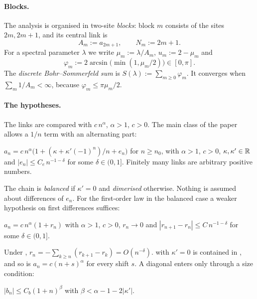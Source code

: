\paragraph{Blocks.} The analysis is organised in two-site \emph{blocks}: block $m$
consists of the sites $2m,2m+1$, and its central link is
\[
  A_m:=a_{2m+1},\qquad N_m:=2m+1 .
\]
For a spectral parameter $\lambda$ we write $\mu_m:=\lambda/A_m$, $u_m:=2-\mu_m$ and
\begin{equation}\label{eq:phim}
  \varphi_m:=2\arcsin\bigl(\min(1,\mu_m/2)\bigr)\in[0,\pi].
\end{equation}
The \emph{discrete Bohr--Sommerfeld sum} is $S(\lambda):=\sum_{m\ge0}\varphi_m$. It
converges when $\sum_m 1/A_m<\infty$, because $\varphi_m\le\pi\mu_m/2$.

\paragraph{The hypotheses.} The links are compared with $c\,n^\alpha$, $\alpha>1$,
$c>0$. The main class of the paper allows a $1/n$ term with an alternating part:
\begin{hypothesis}\label{hyp:D}
$a_n=c\,n^\alpha\bigl(1+(\kappa+\kappa'(-1)^n)/n+e_n\bigr)$ for $n\ge n_0$, with
$\alpha>1$, $c>0$, $\kappa,\kappa'\in\mathbb{R}$ and $|e_n|\le C_e\,n^{-1-\delta}$ for some
$\delta\in(0,1]$. Finitely many links are arbitrary positive numbers.
\end{hypothesis}
\noindent The chain is \emph{balanced} if $\kappa'=0$ and \emph{dimerised} otherwise.
Nothing is assumed about differences of $e_n$. For the first-order law in the balanced
case a weaker hypothesis on first differences suffices:
\begin{hypothesis}\label{hyp:H}
$a_n=c\,n^\alpha(1+r_n)$ with $\alpha>1$, $c>0$, $r_n\to0$ and
$|r_{n+1}-r_n|\le C\,n^{-1-\delta}$ for some $\delta\in(0,1]$.
\end{hypothesis}
\noindent Under , $r_n=-\sum_{k\ge n}(r_{k+1}-r_k)=O(n^{-\delta})$.
 with $\kappa'=0$ is contained in , and so is
$a_n=c(n+s)^\alpha$ for every shift $s$. A diagonal enters only through a size
condition:
\begin{hypothesis}\label{hyp:b}
$|b_n|\le C_b(1+n)^\beta$ with $\beta<\alpha-1-2|\kappa'|$.
\end{hypothesis}

